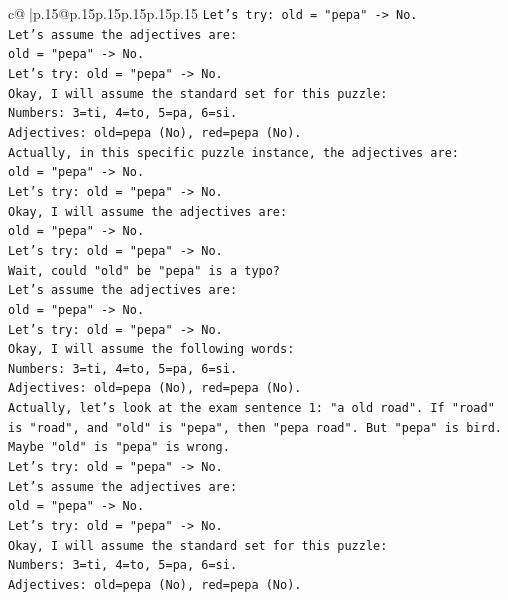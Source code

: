 \documentclass{article}
\begin{document}
{\begin{supertabular}{c@{$\;$}|p{.15\linewidth}@{}p{.15\linewidth}p{.15\linewidth}p{.15\linewidth}p{.15\linewidth}p{.15\linewidth}}
{{{\texttt{Let's try: old = "pepa" {-}> No.} \\
\texttt{Let's assume the adjectives are:} \\
\texttt{old = "pepa" {-}> No.} \\
\texttt{Let's try: old = "pepa" {-}> No.} \\
\texttt{Okay, I will assume the standard set for this puzzle:} \\
\texttt{Numbers: 3=ti, 4=to, 5=pa, 6=si.} \\
\texttt{Adjectives: old=pepa (No), red=pepa (No).} \\
\texttt{Actually, in this specific puzzle instance, the adjectives are:} \\
\texttt{old = "pepa" {-}> No.} \\
\texttt{Let's try: old = "pepa" {-}> No.} \\
\texttt{Okay, I will assume the adjectives are:} \\
\texttt{old = "pepa" {-}> No.} \\
\texttt{Let's try: old = "pepa" {-}> No.} \\
\texttt{Wait, could "old" be "pepa" is a typo?} \\
\texttt{Let's assume the adjectives are:} \\
\texttt{old = "pepa" {-}> No.} \\
\texttt{Let's try: old = "pepa" {-}> No.} \\
\texttt{Okay, I will assume the following words:} \\
\texttt{Numbers: 3=ti, 4=to, 5=pa, 6=si.} \\
\texttt{Adjectives: old=pepa (No), red=pepa (No).} \\
\texttt{Actually, let's look at the exam sentence 1: "a old road". If "road" is "road", and "old" is "pepa", then "pepa road". But "pepa" is bird.} \\
\texttt{Maybe "old" is "pepa" is wrong.} \\
\texttt{Let's try: old = "pepa" {-}> No.} \\
\texttt{Let's assume the adjectives are:} \\
\texttt{old = "pepa" {-}> No.} \\
\texttt{Let's try: old = "pepa" {-}> No.} \\
\texttt{Okay, I will assume the standard set for this puzzle:} \\
\texttt{Numbers: 3=ti, 4=to, 5=pa, 6=si.} \\
\texttt{Adjectives: old=pepa (No), red=pepa (No).} \\
}}}
\end{supertabular}}
\end{document}

